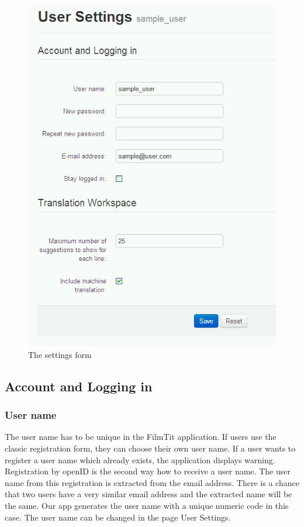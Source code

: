 \begin{figure}[h]
\begin{center}
\includegraphics[scale=0.4]{figures/user_manual/user_settings.png}
\end{center}
\caption{The settings form}
\end{figure}

\subsection{Account and Logging in}
\subsubsection{User name}

The user name has to be unique in the FilmTit application. If users use the classic registration form, they can choose their own user name. If a user wants to register a user name which already exists, the application displays warning. Registration by openID is the second way how to receive a user name. The user name from this registration is extracted from the email address.
There is a chance that two users have a very similar email address and the extracted name will be the same. Our app generates the user name with a unique numeric code in this case. 
The user name can be changed in the page User Settings.


